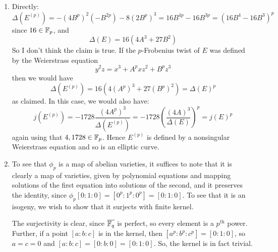 \documentclass{article}
\begin{document}
\begin{enumerate}
	\item Directly:
	\[ \Delta(E^{(p)}) = -(4B^p)^2(-B^{2p})-8(2B^p)^3 = 16B^{4p}-16B^{3p} = (16B^4-16B^3)^p \]
	since $16 \in \mathbb{F}_p$, and
	\[ \Delta(E) = 16(4A^3+27B^2) \]
	So I don't think the claim is true. If the $p$-Frobenius twist of $E$ was defined by the Weierstrass equation
	\[ y^2z = x^3+A^pxz^2+B^pz^3 \]
	then we would have
	\[ \Delta(E^{(p)}) = 16(4(A^p)^3+27(B^p)^2) = \Delta(E)^p \]
	as claimed. In this case, we would also have:
	\[ j(E^{(p)}) = -1728\frac{(4A^p)^3}{\Delta(E^{(p)})} = -1728\left(\frac{(4A)^3}{\Delta(E)}\right)^p = j(E)^p \]
	again using that $4,1728 \in \mathbb{F}_p$. Hence $E^{(p)}$ is defined by a nonsingular Weierstrass equation and so is an elliptic curve.
	
	\item To see that $\phi_p$ is a map of abelian varieties, it suffices to note that it is clearly a map of varieties, given by polynomial equations and mapping solutions of the first equation into solutions of the second, and it preserves the identity, since $\phi_p[0:1:0] = [0^p:1^p:0^p] = [0:1:0]$. To see that it is an isogeny, we wish to show that it surjects with finite kernel.
	
	The surjectivity is clear, since $\overline{\mathbb{F}_q}$ is perfect, so every element is a $p^\text{th}$ power. Further, if a point $[a:b:c]$ is in the kernel, then $[a^p:b^p:c^p] = [0:1:0]$, so $a=c=0$ and $[a:b:c] = [0:b:0] = [0:1:0]$. So, the kernel is in fact trivial.
\end{enumerate}
\end{document}
